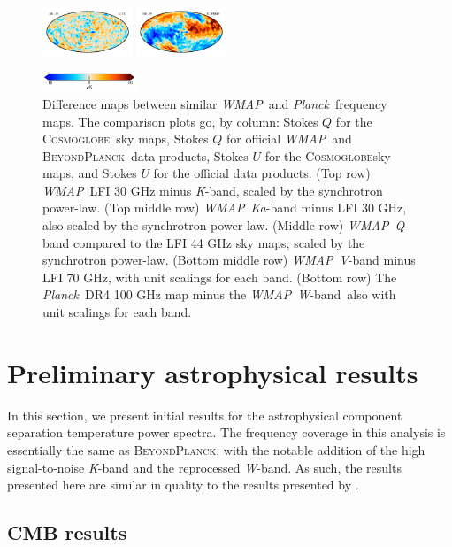\documentclass[twocolumn]{../../common/aa}
\def\WMAP{\emph{WMAP}}
\def\Planck{\emph{Planck}}
\newcommand{\BP}{\textsc{BeyondPlanck}}
\newcommand{\bp}{\textsc{BeyondPlanck}}
\newcommand{\cosmoglobe}{\textsc{Cosmoglobe}}
\newcommand{\K}[0]{\textit K}
\newcommand{\Ka}[0]{\textit{Ka}}
\newcommand{\Q}[0]{\textit Q}
\newcommand{\V}[0]{\textit V}
\newcommand{\W}[0]{\textit W}
\begin{document}
\begin{figure}
	\includegraphics[width=0.24\textwidth]{figures/100W_deltaU.pdf}
	\includegraphics[width=0.24\textwidth]{figures/100W_W_deltaU.pdf}
	
        \includegraphics[width=0.25\textwidth]{figures/cbar_10uK.pdf}
	\caption{Difference maps between similar \WMAP\ and \Planck\ frequency maps. The comparison plots go, by column: Stokes $Q$ for the \cosmoglobe\ sky maps, Stokes $Q$ for official \WMAP\ and \BP\ data products, Stokes $U$ for the \cosmoglobe sky maps, and Stokes $U$ for the official data products. (Top row) \WMAP\ LFI 30 GHz minus \K-band, scaled by the synchrotron power-law. (Top middle row) \WMAP\ \Ka-band minus LFI 30 GHz, also scaled by the synchrotron power-law. (Middle row) \WMAP\ \Q-band compared to the LFI 44 GHz sky maps, scaled by the synchrotron power-law. (Bottom middle row) \WMAP\ \V-band minus LFI 70 GHz, with unit scalings for each band. (Bottom row) The \Planck\ DR4 100 GHz map minus the \WMAP\ \W-band\, also with unit scalings for each band.}
	\label{fig:wmap_lfi_compare}
\end{figure}


\section{Preliminary astrophysical results}
\label{sec:astrophysics}

In this section, we present initial results for the astrophysical component separation temperature power spectra. The frequency coverage in this analysis is essentially the same as \bp, with the notable addition of the high signal-to-noise \K-band and the reprocessed \W-band. As such, the results presented here are similar in quality to the results presented by \citet{bp01}.

\subsection{CMB results}
\label{sec:cmb}
\end{document}
